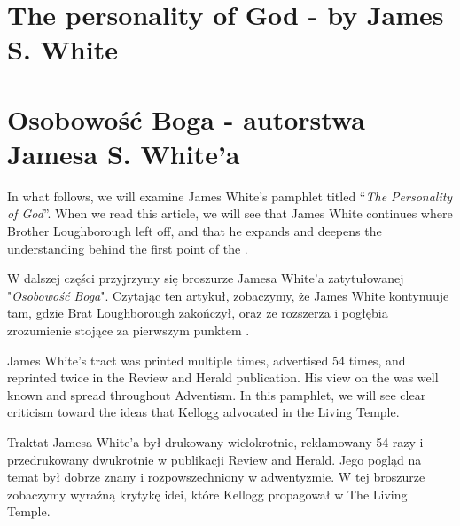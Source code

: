 \chapter{The personality of God - by James S. White}


\chapter{Osobowość Boga - autorstwa Jamesa S. White'a}


In what follows, we will examine James White’s pamphlet titled “\textit{The Personality of God}”. When we read this article, we will see that James White continues where Brother Loughborough left off, and that he expands and deepens the understanding behind the first point of the .


W dalszej części przyjrzymy się broszurze Jamesa White'a zatytułowanej "\textit{Osobowość Boga}". Czytając ten artykuł, zobaczymy, że James White kontynuuje tam, gdzie Brat Loughborough zakończył, oraz że rozszerza i pogłębia zrozumienie stojące za pierwszym punktem .


James White’s tract was printed multiple times, advertised 54 times, and reprinted twice in the Review and Herald publication. His view on the  was well known and spread throughout Adventism. In this pamphlet, we will see clear criticism toward the ideas that Kellogg advocated in the Living Temple.


Traktat Jamesa White'a był drukowany wielokrotnie, reklamowany 54 razy i przedrukowany dwukrotnie w publikacji Review and Herald. Jego pogląd na temat  był dobrze znany i rozpowszechniony w adwentyzmie. W tej broszurze zobaczymy wyraźną krytykę idei, które Kellogg propagował w The Living Temple.


